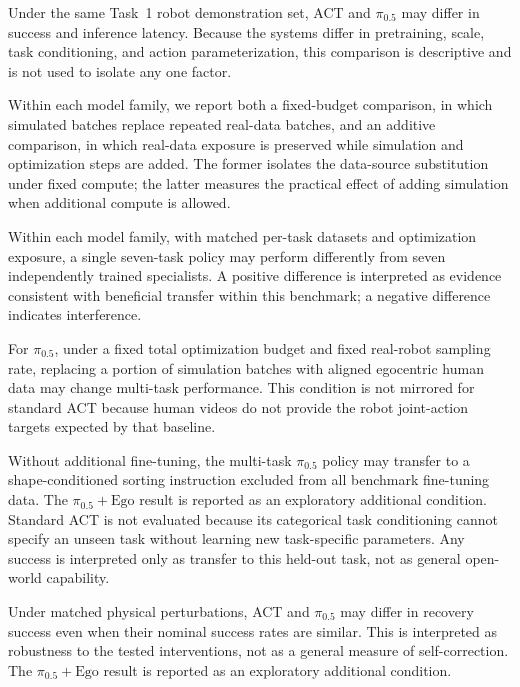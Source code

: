 \documentclass[10pt,conference]{IEEEtran}
\begin{document}
\begin{description}[leftmargin=0pt,labelindent=0pt,style=nextline]
    \item[H1: Model-family comparison]
    Under the same Task~1 robot demonstration set, ACT and $\pi_{0.5}$ may
    differ in success and inference latency. Because the systems differ in
    pretraining, scale, task conditioning, and action parameterization, this
    comparison is descriptive and is not used to isolate any one factor.

    \item[H2: Simulation data]
    Within each model family, we report both a fixed-budget comparison, in which
    simulated batches replace repeated real-data batches, and an additive
    comparison, in which real-data exposure is preserved while simulation and
    optimization steps are added. The former isolates the data-source
    substitution under fixed compute; the latter measures the practical effect
    of adding simulation when additional compute is allowed.

    \item[H3: Multi-task parameter sharing]
    Within each model family, with matched per-task datasets and optimization
    exposure, a single seven-task policy may perform differently from seven
    independently trained specialists. A positive difference is interpreted as
    evidence consistent with beneficial transfer within this benchmark; a
    negative difference indicates interference.

    \item[H4: Egocentric human data]
    For $\pi_{0.5}$, under a fixed total optimization budget and fixed
    real-robot sampling rate, replacing a portion of simulation batches with
    aligned egocentric human data may change multi-task performance. This
    condition is not mirrored for standard ACT because human videos do not
    provide the robot joint-action targets expected by that baseline.

    \item[H5: Held-out-task generalization]
    Without additional fine-tuning, the multi-task $\pi_{0.5}$ policy may
    transfer to a shape-conditioned sorting instruction excluded from all
    benchmark fine-tuning data. The $\pi_{0.5}+\mathrm{Ego}$ result is reported
    as an exploratory additional condition. Standard ACT is not evaluated
    because its categorical task conditioning cannot specify an unseen task
    without learning new task-specific parameters. Any success is interpreted
    only as transfer to this held-out task, not as general open-world capability.

    \item[H6: Perturbation recovery]
    Under matched physical perturbations, ACT and $\pi_{0.5}$ may differ in
    recovery success even when their nominal success rates are similar. This is
    interpreted as robustness to the tested interventions, not as a general
    measure of self-correction. The $\pi_{0.5}+\mathrm{Ego}$ result is reported
    as an exploratory additional condition.
\end{description}
\end{document}
